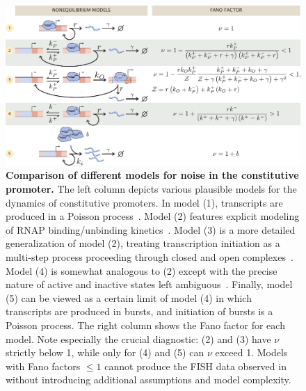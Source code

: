 \begin{figure}%
\centering
\includegraphics[width=\textwidth]{../figures/main/fig02.pdf}
\caption{\textbf{Comparison of different models for noise in the constitutive promoter.}
The left column depicts various plausible models for the dynamics of constitutive promoters.
In
model (1), transcripts are produced in a Poisson process~\cite{Jones2014}. Model
(2) features explicit modeling of RNAP binding/unbinding
kinetics~\cite{Phillips2015a}. Model (3) is a more detailed generalization of
model (2), treating transcription initiation as a multi-step process proceeding
through closed and open complexes~\cite{Mitarai2015}. Model (4) is somewhat
analogous to (2) except with the precise nature of active and inactive states
left ambiguous~\cite{Razo-Mejia2020}. Finally, model (5) can be viewed as a
certain limit of model (4) in which transcripts are produced in bursts, and
initiation of bursts is a Poisson process. 
The right column shows the
Fano factor for each model. Note especially the crucial diagnostic: (2) and (3)
have $\nu$ strictly below 1, while only for (4) and (5) can $\nu$ exceed 1.
Models with Fano factors $\le 1$ cannot produce the FISH data observed
in~\cite{Jones2014} without introducing additional assumptions and model
complexity.}
\label{fig2:constit_cartoons}
\end{figure}

